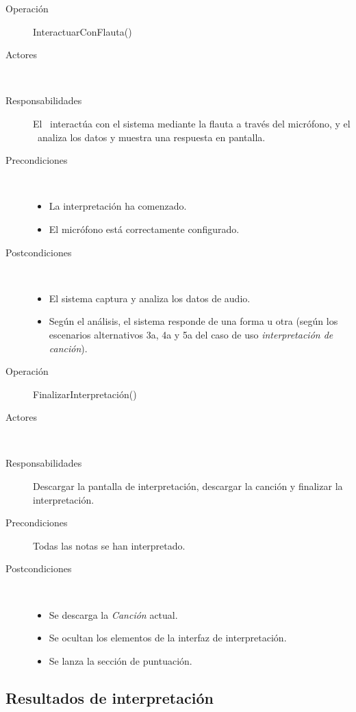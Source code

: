 \begin{description}
\item[Operación] InteractuarConFlauta()
\item[Actores] \jugador\, \sistema\
\item[Responsabilidades] El \jugador\ interactúa con el sistema mediante la
  flauta a través del micrófono, y el \sistema\ analiza los datos y muestra una
  respuesta en pantalla.
\item[Precondiciones] $\quad$
  \begin{itemize}
  \item La interpretación ha comenzado.
  \item El micrófono está correctamente configurado.
  \end{itemize}
\item[Postcondiciones] $\quad$
  \begin{itemize}
  \item El sistema captura y analiza los datos de audio.
  \item Según el análisis, el sistema responde de una forma u otra (según los
    escenarios alternativos 3a, 4a y 5a del caso de uso \textit{interpretación
      de canción}).
  \end{itemize}
\end{description}

\begin{description}
\item[Operación] FinalizarInterpretación()
\item[Actores] \jugador\, \sistema\
\item[Responsabilidades] Descargar la pantalla de interpretación, descargar la
  canción y finalizar la interpretación.
\item[Precondiciones] Todas las notas se han interpretado.
\item[Postcondiciones] $\quad$
  \begin{itemize}
  \item Se descarga la \textit{Canción} actual.
  \item Se ocultan los elementos de la interfaz de interpretación.
  \item Se lanza la sección de puntuación.
  \end{itemize}
\end{description}


\subsection{Resultados de interpretación}

